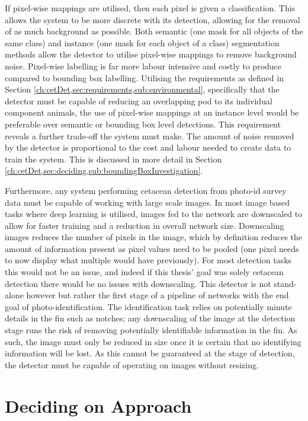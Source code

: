  If pixel-wise mappings are utilised, then each pixel is given a classification. This allows the system to be more discrete with its detection, allowing for the removal of as much background as possible. Both semantic (one mask for all objects of the same class) and instance (one mask for each object of a class) segmentation methods allow the detector to utilise pixel-wise mappings to remove background noise. Pixel-wise labelling is far more labour intensive and costly to produce compared to bounding box labelling. Utilising the requirements as defined in Section \ref{ch:cetDet,sec:requirements,sub:environmental}, specifically that the detector must be capable of reducing an overlapping pod to its individual component animals, the use of pixel-wise mappings at an instance level would be preferable over semantic or bounding box level detections. This requirement reveals a further trade-off the system must make. The amount of noise removed by the detector is proportional to the cost and labour needed to create data to train the system. This is discussed in more detail in Section \ref{ch:cetDet,sec:deciding,sub:boundingBoxInvestigation}.
 
 Furthermore, any system performing cetacean detection from photo-id survey data must be capable of working with large scale images. In most image based tasks where deep learning is utilised, images fed to the network are downscaled to allow for faster training and a reduction in overall network size. Downscaling images reduces the number of pixels in the image, which by definition reduces the amount of information present as pixel values need to be pooled (one pixel needs to now display what multiple would have previously). For most detection tasks this would not be an issue, and indeed if this thesis' goal was solely cetacean detection there would be no issues with downscaling. This detector is not stand-alone however but rather the first stage of a pipeline of networks with the end goal of photo-identification. The identification task relies on potentially minute details in the fin such as notches; any downscaling of the image at the detection stage runs the risk of removing potentially identifiable information in the fin. As such, the image must only be reduced in size once it is certain that no identifying information will be lost. As this cannot be guaranteed at the stage of detection, the detector must be capable of operating on images without resizing.
 
\section{Deciding on Approach}\label{ch:cetDet,sec:deciding}

